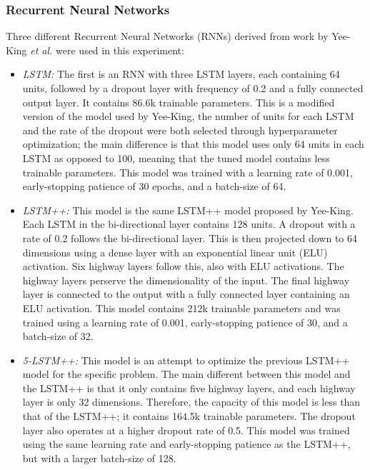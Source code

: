 \subsubsection{Recurrent Neural Networks}
Three different Recurrent Neural Networks (RNNs) derived from work by Yee-King \textit{et al.} \cite{yee2018automatic} were used in this experiment:
\begin{itemize}
    \item \textit{LSTM:} The first is an RNN with three LSTM layers, each containing 64 units, followed by a dropout layer with frequency of 0.2 and a fully connected output layer. It contains 86.6k trainable parameters. This is a modified version of the model used by Yee-King, the number of units for each LSTM and the rate of the dropout were both selected through hyperparameter optimization; the main difference is that this model uses only 64 units in each LSTM as opposed to 100, meaning that the tuned model contains less trainable parameters. This model was trained with a learning rate of 0.001, early-stopping patience of 30 epochs, and a batch-size of 64.
    \item \textit{LSTM++:} This model is the same LSTM++ model proposed by Yee-King. Each LSTM in the bi-directional layer contains 128 units. A dropout with a rate of 0.2 follows the bi-directional layer. This is then projected down to 64 dimensions using a dense layer with an exponential linear unit (ELU) activation. Six highway layers follow this, also with ELU activations. The highway layers perserve the dimensionality of the input. The final highway layer is connected to the output with a fully connected layer containing an ELU activation. This model contains 212k trainable parameters and was trained using a learning rate of 0.001, early-stopping patience of 30, and a batch-size of 32.
    \item \textit{5-LSTM++:} This model is an attempt to optimize the previous LSTM++ model for the specific problem. The main different between this model and the LSTM++ is that it only contains five highway layers, and each highway layer is only 32 dimensions. Therefore, the capacity of this model is less than that of the LSTM++; it contains 164.5k trainable parameters. The dropout layer also operates at a higher dropout rate of 0.5. This model was trained using the same learning rate and early-stopping patience as the LSTM++, but with a larger batch-size of 128.
\end{itemize}

